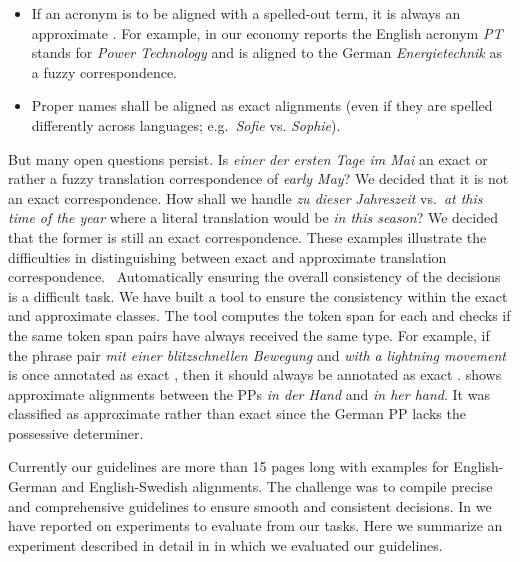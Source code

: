 \documentclass[output=paper]{LSP/langsci}
\begin{document}
\begin{itemize}
\item 
If an acronym is to be aligned with a spelled-out term, it is always an approximate . For example, in our economy reports the English acronym \textit{PT} stands for \textit{Power Technology} and is aligned to the German \textit{Energietechnik} as a fuzzy correspondence. 
\item  
Proper names shall be aligned as exact alignments (even if they are spelled differently across languages; e.g.~\textit{Sofie} vs. \textit{Sophie}).
\end{itemize} 

But many open questions persist. Is \textit{einer der ersten Tage im Mai }an exact or rather a fuzzy translation correspondence of \textit{early May}? We decided that it is not an exact correspondence. How shall we handle \textit{zu dieser} \textit{Jahreszeit} vs.~\textit{at this time of the year }where a literal translation would be \textit{in this season}? We decided that the former is still an exact correspondence. These examples illustrate the difficulties in distinguishing between exact and approximate translation correspondence. 
\
Automatically ensuring the overall consistency of the  decisions is a difficult task. We have built a tool to ensure the consistency within the exact and approximate  classes. The tool computes the token span for each  and checks if the same token span pairs have always received the same  type. For example, if the phrase pair \textit{mit einer blitzschnellen Bewegung} and \textit{with a} \textit{lightning movement} is once annotated as exact , then it should always be annotated as exact .  shows approximate alignments between the PPs \textit{in der Hand }and \textit{in her hand}. It was classified as approximate rather than exact  since the German PP lacks the possessive determiner. 

Currently our  guidelines are more than 15 pages long with examples for English-German and English-Swedish alignments. The challenge was to compile precise and comprehensive guidelines to ensure smooth and consistent  decisions. In \citet{Samuelsson2006} we have reported on experiments to evaluate  from our  tasks. Here we summarize an experiment described in detail in \citet{Volk2008} in which we evaluated our  guidelines. 
\end{document}
